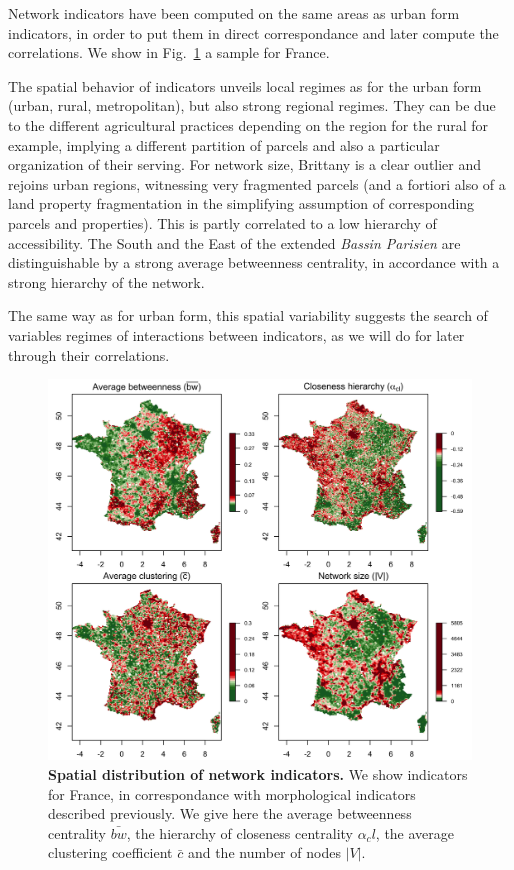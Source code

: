 \documentclass[11pt]{article}
\begin{document}
Network indicators have been computed on the same areas as urban form indicators, in order to put them in direct correspondance and later compute the correlations. We show in Fig.~\ref{fig:staticcorrs:network} a sample for France.

The spatial behavior of indicators unveils local regimes as for the urban form (urban, rural, metropolitan), but also strong regional regimes. They can be due to the different agricultural practices depending on the region for the rural for example, implying a different partition of parcels and also a particular organization of their serving. For network size, Brittany is a clear outlier and rejoins urban regions, witnessing very fragmented parcels (and a fortiori also of a land property fragmentation in the simplifying assumption of corresponding parcels and properties). This is partly correlated to a low hierarchy of accessibility. The South and the East of the extended \emph{Bassin Parisien} are distinguishable by a strong average betweenness centrality, in accordance with a strong hierarchy of the network.

The same way as for urban form, this spatial variability suggests the search of variables regimes of interactions between indicators, as we will do for later through their correlations.

\begin{figure}
\includegraphics[width=\linewidth]{indics_network_en_areasize100_offset50_factor0_5.png}
\caption{\textbf{Spatial distribution of network indicators.} We show indicators for France, in correspondance with morphological indicators described previously. We give here the average betweenness centrality $\bar{bw}$, the hierarchy of closeness centrality $\alpha_cl$, the average clustering coefficient $\bar{c}$ and the number of nodes $\left|V\right|$.\label{fig:staticcorrs:network}}
\end{figure}
\end{document}
